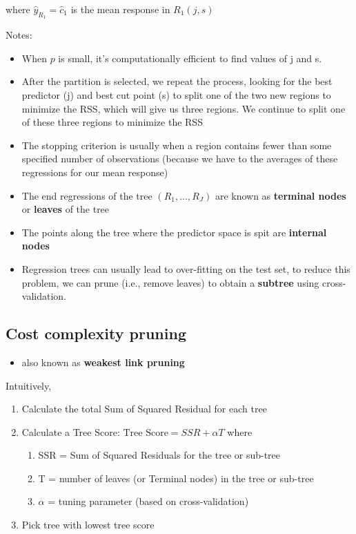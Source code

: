 \documentclass[
]{book}
\providecommand{\tightlist}{%
  \setlength{\itemsep}{0pt}\setlength{\parskip}{0pt}}
\begin{document}
where \(\hat{y}_{R_1} = \hat{c}_1\) is the mean response in \(R_1(j,s)\)

Notes:

\begin{itemize}
\item
  When \(p\) is small, it's computationally efficient to find values of j and s.
\item
  After the partition is selected, we repeat the process, looking for the best predictor (j) and best cut point (s) to split one of the two new regions to minimize the RSS, which will give us three regions. We continue to split one of these three regions to minimize the RSS
\item
  The stopping criterion is usually when a region contains fewer than some specified number of observations (because we have to the averages of these regressions for our mean response)
\item
  The end regressions of the tree \((R_1, \dots, R_J)\) are known as \textbf{terminal nodes} or \textbf{leaves} of the tree
\item
  The points along the tree where the predictor space is spit are \textbf{internal nodes}
\item
  Regression trees can usually lead to over-fitting on the test set, to reduce this problem, we can prune (i.e., remove leaves) to obtain a \textbf{subtree} using cross-validation.
\end{itemize}

\hypertarget{cost-complexity-pruning}{%
\subsection{Cost complexity pruning}\label{cost-complexity-pruning}}

\begin{itemize}
\tightlist
\item
  also known as \textbf{weakest link pruning}
\end{itemize}

Intuitively,

\begin{enumerate}
\def\labelenumi{\arabic{enumi}.}
\item
  Calculate the total Sum of Squared Residual for each tree
\item
  Calculate a Tree Score: \(\text{Tree Score} = SSR + \alpha T\) where

  \begin{enumerate}
  \def\labelenumii{\arabic{enumii}.}
  \item
    SSR = Sum of Squared Residuals for the tree or sub-tree
  \item
    T = number of leaves (or Terminal nodes) in the tree or sub-tree
  \item
    \(\alpha\) = tuning parameter (based on cross-validation)
  \end{enumerate}
\item
  Pick tree with lowest tree score
\end{enumerate}
\end{document}
